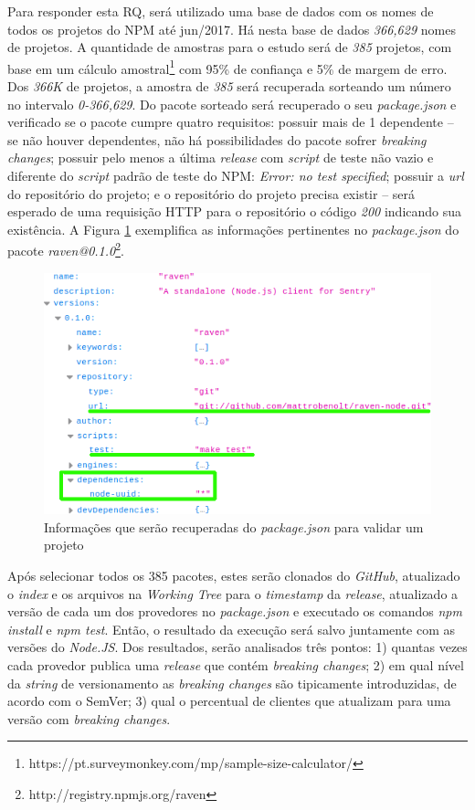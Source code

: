 Para responder esta RQ, será utilizado uma base de dados com os nomes de todos os projetos do \Gls{NPM} até jun/2017. Há nesta base de dados \textit{366,629} nomes de projetos. A quantidade de amostras para o estudo será de \textit{385} projetos, com base em um cálculo amostral\footnote{https://pt.surveymonkey.com/mp/sample-size-calculator/} com 95\% de confiança e 5\% de margem de erro. Dos \textit{366K} de projetos, a amostra de \textit{385} será recuperada sorteando um número no intervalo \textit{0-366,629}. Do pacote sorteado será recuperado o seu \textit{package.json} e verificado se o pacote cumpre quatro requisitos: possuir mais de 1 dependente --  se não houver dependentes, não há possibilidades do pacote sofrer \textit{breaking changes}; possuir pelo menos a última \textit{release} com \textit{script} de teste não vazio e diferente do \textit{script} padrão de teste do \gls{NPM}: \textit{Error: no test specified}; possuir a \textit{url} do repositório do projeto; e o repositório do projeto precisa existir -- será esperado de uma requisição \Gls{HTTP} para o repositório o código \textit{200} indicando sua existência. A Figura \ref{fig:package_json} exemplifica as informações pertinentes no \textit{package.json} do pacote \textit{raven@0.1.0}\footnote{http://registry.npmjs.org/raven}.

\begin{figure}
    \centering
    \includegraphics[scale=0.7]{figuras/package_json.png}
    \caption{Informações que serão recuperadas do \textit{package.json} para validar um projeto}
    \label{fig:package_json}
\end{figure}{}

Após selecionar todos os 385 pacotes, estes serão clonados do \textit{GitHub}, atualizado o \textit{index} e os arquivos na \textit{Working Tree} para o \textit{timestamp} da \textit{release}, atualizado a versão de cada um dos provedores no \textit{package.json} e executado os comandos \textit{npm install} e \textit{npm test}. Então, o resultado da execução será salvo juntamente com as  versões do \textit{Node.JS}. Dos resultados, serão analisados três pontos: 1) quantas vezes cada provedor publica uma \textit{release} que contém \textit{breaking changes}; 2) em qual nível da \textit{string} de versionamento as \textit{breaking changes} são tipicamente introduzidas, de acordo com o \Gls{SemVer}; 3) qual o percentual de clientes que atualizam para uma versão com \textit{breaking changes}.

